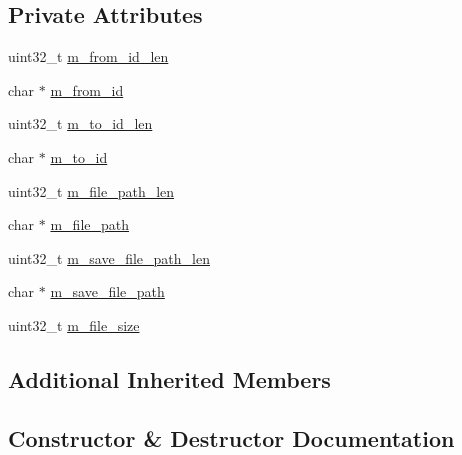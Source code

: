\subsection*{Private Attributes}
\begin{DoxyCompactItemize}
\item 
uint32\+\_\+t \hyperlink{class_c_im_pdu_client_file_upload_finish_a2caa4fa9bcd9d37e5388bfee77e16396}{m\+\_\+from\+\_\+id\+\_\+len}
\item 
char $\ast$ \hyperlink{class_c_im_pdu_client_file_upload_finish_a7eb5c3f70096d5afcdd27021b18aa3c5}{m\+\_\+from\+\_\+id}
\item 
uint32\+\_\+t \hyperlink{class_c_im_pdu_client_file_upload_finish_aef6b91cb0d6c8fc4839d6be4d7fdb645}{m\+\_\+to\+\_\+id\+\_\+len}
\item 
char $\ast$ \hyperlink{class_c_im_pdu_client_file_upload_finish_ae06daddb78cc8aa4ced6cd870afea556}{m\+\_\+to\+\_\+id}
\item 
uint32\+\_\+t \hyperlink{class_c_im_pdu_client_file_upload_finish_a255e6ef15736c48cea33114c532cd3d6}{m\+\_\+file\+\_\+path\+\_\+len}
\item 
char $\ast$ \hyperlink{class_c_im_pdu_client_file_upload_finish_a7b3de3c6565e18d52be5e25500af7f95}{m\+\_\+file\+\_\+path}
\item 
uint32\+\_\+t \hyperlink{class_c_im_pdu_client_file_upload_finish_a26978834933c1f8587d846c59a5ec898}{m\+\_\+save\+\_\+file\+\_\+path\+\_\+len}
\item 
char $\ast$ \hyperlink{class_c_im_pdu_client_file_upload_finish_a8a9af6820b8972e5cc14cb49614a3e46}{m\+\_\+save\+\_\+file\+\_\+path}
\item 
uint32\+\_\+t \hyperlink{class_c_im_pdu_client_file_upload_finish_a2281febf135e2b7513a741caf00f29de}{m\+\_\+file\+\_\+size}
\end{DoxyCompactItemize}
\subsection*{Additional Inherited Members}


\subsection{Constructor \& Destructor Documentation}
\hypertarget{class_c_im_pdu_client_file_upload_finish_abf2f43d2f6a3c4368aaffbc803ac65c5}{}
